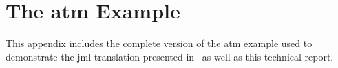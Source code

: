 
\chapter{The \ac{atm} \vsl Example}
\label{app:atm-model}

This appendix includes the complete version of the \vsl \ac{atm}
example used to demonstrate the \ac{jml} translation presented
in~\cite{Jorgensen&16a} as well as this technical report.



